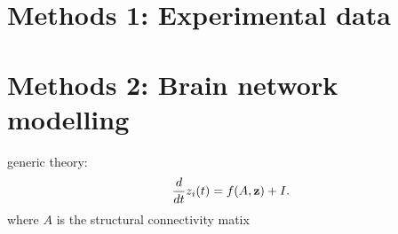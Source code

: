 \documentclass[oneside]{zHenriquesLab-StyleBioRxiv}
\begin{document}














\section*{Methods 1: Experimental data}

\section*{Methods 2: Brain network modelling}
generic theory:
\begin{equation}
	\frac{d}{dt}z_{i}(t) = f(A,{\bf z}) + I.
\end{equation}
where $A$ is the structural connectivity matix 
\end{document}
